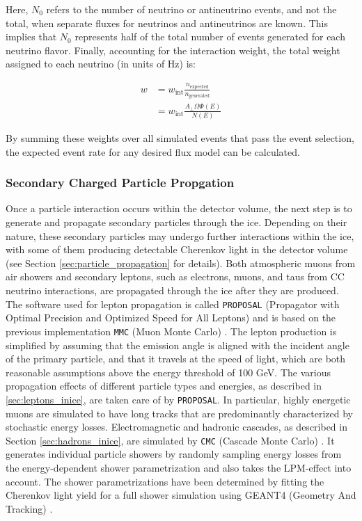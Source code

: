 Here, $N_0$ refers to the number of neutrino or antineutrino events, and not the total, when separate fluxes for neutrinos and antineutrinos are known. This implies that $N_0$ represents half of the total number of events generated for each neutrino flavor. Finally, accounting for the interaction weight, the total weight assigned to each neutrino (in units of Hz) is:

\begin{equation}
    \begin{split}
        w &= w_{\text{int}} \frac{n_{\mathrm{expected}}}{n_{\mathrm{generated}}}\\
           &= w_{\text{int}} \frac{A_\perp \Omega \Phi(E)}{N(E)}
    \end{split}
\end{equation}

By summing these weights over all simulated events that pass the event selection, the expected event rate for any desired flux model can be calculated.

\subsubsection*{Secondary Charged Particle Propgation}
Once a particle interaction occurs within the detector volume, the next step is to generate and propagate secondary particles through the ice. Depending on their nature, these secondary particles may undergo further interactions within the ice, with some of them producing detectable Cherenkov light in the detector volume (see Section \ref{sec:particle_propagation} for details). Both atmospheric muons from air showers and secondary leptons, such as electrons, muons, and taus from CC neutrino interactions, are propagated through the ice after they are produced. The software used for lepton propagation is called \texttt{PROPOSAL} (Propagator with Optimal Precision and Optimized Speed for All Leptons)  and is based on the previous implementation \texttt{MMC} (Muon Monte Carlo) . The lepton production is simplified by assuming that the emission angle is aligned with the incident angle of the primary particle, and that it travels at the speed of light, which are both reasonable assumptions above the energy threshold of 100 GeV. The various propagation effects of different particle types and energies, as described in \ref{sec:leptons_inice}, are taken care of by \texttt{PROPOSAL}. In particular, highly energetic muons are simulated to have long tracks that are predominantly characterized by stochastic energy losses. Electromagnetic and hadronic cascades, as described in Section \ref{sec:hadrons_inice}, are simulated by \texttt{CMC} (Cascade Monte Carlo) . It generates individual particle showers by randomly sampling energy losses from the energy-dependent shower parametrization and also takes the LPM-effect into account. The shower parametrizations have been determined by fitting the Cherenkov light yield for a full shower simulation using GEANT4 (Geometry And Tracking) .

